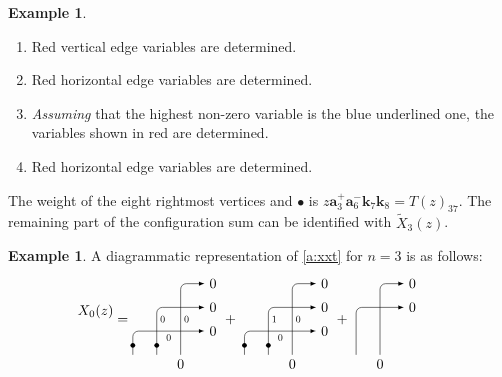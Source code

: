 \documentclass[11pt]{article}
\theoremstyle{definition}
\newtheorem{exam}[theo]{Example}
\numberwithin{equation}{section}
\newcommand{\aaa}{\mathbf{a}}
\newcommand{\kk}{\mathbf{k}}
\begin{document}
\begin{exam}
\begin{enumerate}
\item Red vertical edge variables are determined.
\item Red horizontal edge variables are determined.
\item{\em Assuming} that the highest non-zero variable is the blue underlined one, the variables shown in red are determined.
\item  Red horizontal edge variables are determined.
\end{enumerate}
The weight of the eight rightmost vertices and $\bullet$ is $z \aaa^+_3\aaa^-_6 \kk_7 \kk_8 = T(z)_{37}$.
The remaining part of the configuration sum can be identified with  $\widetilde{X}_3(z)$.
\end{exam}


\begin{exam}
A diagrammatic representation of \eqref{a:xxt} for $n=3$ is as follows:
\begin{align*}
\raisebox{9pt}{$X_0(z)$} & \begin{array}{@{\;=}c@{\;+\;}c@{\;+\;}c} \begin{tikzpicture}[scale=.6,>=latex,rounded corners,baseline=-1cm,rotate=-90]
\draw[->] (3,0) node[anchor=north] {$0$} -- (0,0) -- (0,1) node[anchor=west] {$0$};
\draw[->] (3,-1) node[anchor=north] {} -- (1,-1) -- (1,1) node[anchor=west] {$0$};
\draw[->] (3,-2) node[anchor=north] {} -- (2,-2) -- (2,1) node[anchor=west] {$0$};
\draw (1.5,0) node[anchor=west,scale=.7] {$0$};
\draw (1.5,-1) node[anchor=west,scale=.7] {$0$};
\draw (2,-.5) node[anchor=north,scale=.7] {$0$};
\fill[black] (2.6,-2) circle (.1);
\fill[black] (2.6,-1) circle (.1);
\end{tikzpicture}
&
\begin{tikzpicture}[scale=.6,>=latex,rounded corners,baseline=-1cm,rotate=-90]
\draw[->] (3,0) node[anchor=north] {$0$} -- (0,0) -- (0,1) node[anchor=west] {$0$};
\draw[->] (3,-1) node[anchor=north] {} -- (1,-1) -- (1,1) node[anchor=west] {$0$};
\draw[->] (3,-2) node[anchor=north] {} -- (2,-2) -- (2,1) node[anchor=west] {$0$};
\draw (1.5,0) node[anchor=west,scale=.7] {$0$};
\draw (1.5,-1) node[anchor=west,scale=.7] {$1$};
\draw (2,-.5) node[anchor=north,scale=.7] {$0$};
\fill[black] (2.6,-2) circle (.1);
\fill[black] (2.6,-1) circle (.1);
\end{tikzpicture}
&
\begin{tikzpicture}[scale=.6,>=latex,rounded corners,baseline=-1cm,rotate=-90]
\draw[->] (3,0) node[anchor=north] {$0$} -- (0,0) -- (0,1) node[anchor=west] {$0$};
\draw[->] (3,-1) node[anchor=north] {} -- (1,-1) -- (1,1) node[anchor=west] {$0$};

\end{tikzpicture}
\end{array}
\end{align*}
\end{exam}
\end{document}
